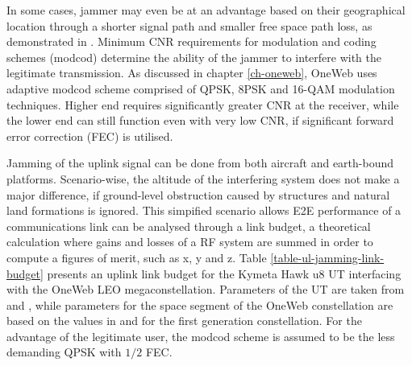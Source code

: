 \documentclass[english, 12pt, a4paper, elec, utf8, a-1b, online]{aaltothesis}
\begin{document}
In some cases, jammer may even be at an advantage based on their geographical location through a shorter signal path and smaller free space path loss, as demonstrated in \cite{pavur2022defcon}.
Minimum CNR requirements for modulation and coding schemes (modcod) determine the ability of the jammer to interfere with the legitimate transmission.
As discussed in chapter \ref{ch-oneweb}, OneWeb uses adaptive modcod scheme comprised of QPSK, 8PSK and 16-QAM modulation techniques. Higher end requires significantly greater CNR at the receiver, while the lower end can still function even with very low CNR, if significant forward error correction (FEC) is utilised. \cite{allen2022terrestrial,etsi2012en302307}


Jamming of the uplink signal can be done from both aircraft and earth-bound platforms.
Scenario-wise, the altitude of the interfering system does not make a major difference, if ground-level obstruction caused by structures and natural land formations is ignored.
This simpified scenario allows E2E performance of a communications link can be analysed through a link budget, a theoretical calculation where gains and losses of a RF system are summed in order to compute a figures of merit, such as x, y and z.%
Table \ref{table-ul-jamming-link-budget} presents an uplink link budget for the Kymeta Hawk u8 UT interfacing with the OneWeb LEO megaconstellation.
Parameters of the UT are taken from \cite{kymeta2022hawk} and \cite{kymeta2020mod}, while parameters for the space segment of the OneWeb constellation are based on the values in \cite{worldvu2016loi} and \cite{allen2022terrestrial} for the first generation constellation.
For the advantage of the legitimate user, the modcod scheme is assumed to be the less demanding QPSK with $1/2$ FEC.
\end{document}
